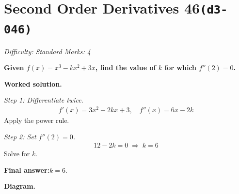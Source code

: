 \documentclass[11pt]{article}
\newcommand{\question}[1]{\par\medskip\noindent\textbf{#1}\par}
\begin{document}
\section*{Second Order Derivatives 46\quad\small\texttt{(d3-046)}}
\textit{Difficulty: Standard \quad\textbar\quad Marks: 4}

\question{Given \( f(x) = x^3 - kx^2 + 3x \), find the value of \( k \) for which \( f''(2) = 0 \).}

\textbf{Worked solution.}

\textit{Step 1: Differentiate twice.}
\[\begin{gathered}
f'(x) = 3x^2 - 2kx + 3, \quad f''(x) = 6x - 2k
\end{gathered}\]
Apply the power rule.

\textit{Step 2: Set \( f''(2) = 0 \).}
\[\begin{gathered}
12 - 2k = 0 \;\Rightarrow\; k = 6
\end{gathered}\]
Solve for \( k \).

\begin{answerbox}
\textbf{Final answer:}\quad \(\displaystyle  k = 6 \).
\end{answerbox}
\textbf{Diagram.}
\end{document}
